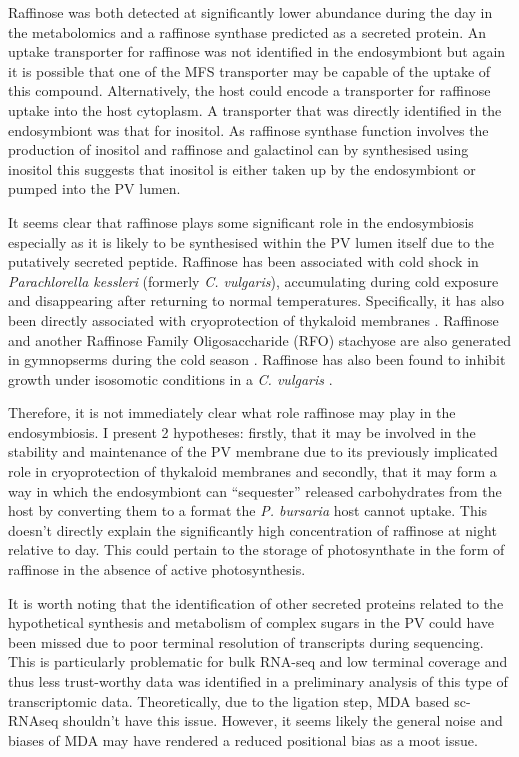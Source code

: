 Raffinose was both detected
at significantly lower abundance during the day in the metabolomics 
and a raffinose synthase predicted as a secreted protein.
An uptake transporter for raffinose was not identified in the endosymbiont 
but again it is possible that one of the MFS transporter may be capable
of the uptake of this compound.  Alternatively, the host could encode
a transporter for raffinose uptake into the host cytoplasm.
A transporter that was directly identified in the endosymbiont was that for inositol.
As raffinose synthase function involves the production of inositol and raffinose
and galactinol can by synthesised using inositol \citep{Caspi2007} this suggests that inositol
is either taken up by the endosymbiont or pumped into the PV lumen.

It seems clear that raffinose plays some significant role in the endosymbiosis
especially as it is likely to be synthesised within the PV lumen itself due
to the putatively secreted peptide.
Raffinose has been associated with cold shock in
\textit{Parachlorella kessleri} (formerly \textit{C. vulgaris}),
accumulating during cold exposure and disappearing after returning
to normal temperatures.
Specifically, it has also been directly associated
with cryoprotection of thykaloid membranes \citep{Lineberger1980}.
Raffinose and another Raffinose Family Oligosaccharide (RFO) 
stachyose are also generated in gymnopserms during
the cold season \citep{Kandler1982}.
Raffinose has also been found to inhibit growth under
isosomotic conditions in a \textit{C. vulgaris} 
\citep{Setter1979}.

Therefore, it is not immediately clear what role raffinose may play in the endosymbiosis. 
I present 2 hypotheses: firstly, that it may be involved in the stability
and maintenance of the PV membrane due to its previously implicated
role in cryoprotection of thykaloid membranes and secondly, that it may form a way
in which the endosymbiont can ``sequester'' released carbohydrates 
from the host by converting them to a format the \textit{P. bursaria} host
cannot uptake.  
This doesn't directly explain 
the significantly high concentration
of raffinose at night relative to day. 
This could pertain to the storage of photosynthate in the
form of raffinose in the absence
of active photosynthesis.

It is worth noting that the identification of other secreted
proteins related to the hypothetical synthesis and metabolism 
of complex sugars in the PV could have been missed due to 
poor terminal resolution of transcripts during sequencing.
This is particularly problematic for bulk RNA-seq and 
low terminal coverage and thus less trust-worthy data 
was identified in a preliminary analysis of this type 
of transcriptomic data.  Theoretically,
due to the ligation step, MDA based sc-RNAseq shouldn't
have this issue.  However, it seems likely the general
noise and biases of MDA may have rendered a reduced
positional bias as a moot issue.

